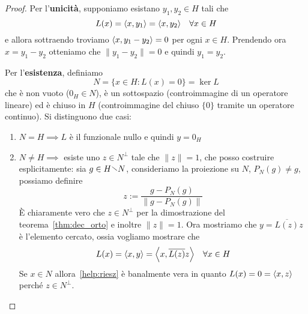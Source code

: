 \begin{proof}
    Per l'\textbf{unicità}, supponiamo esistano \(y_{1}, y_{2} \in H\) tali che
    \[
        L{(x)} = {\left\langle x, y_{1}\right\rangle} = {\left\langle x, y_{2}\right\rangle} \quad \forall x \in H
    \]
    e allora sottraendo troviamo \({\left\langle x, y_{1} - y_{2}\right\rangle} = 0\) per ogni \(x
    \in H\). Prendendo ora \(x = y_{1} - y_{2}\) otteniamo che \(\|y_{1} -
    y_{2}\| = 0\) e quindi \(y_{1} = y_{2}\).

    Per l'\textbf{esistenza}, definiamo 
    \[
      N = \{x \in H : L{(x)} = 0\} = \ker L
    \]
    che è non vuoto (\(0_H \in N\)), è un
    sottospazio (controimmagine di un operatore lineare) ed è chiuso in \(H\)
    (controimmagine del chiuso \(\{0\}\) tramite
    un operatore continuo). Si distinguono due casi:
\begin{enumerate}[label = \arabic*.]
    \item \(N = H \implies L\) è il funzionale nullo e quindi \(y = 0_H\) 
    \item \(N \neq H \implies \) esiste uno \(z \in N^\perp \) tale che
        \(\|z\| = 1\), che posso costruire esplicitamente: sia \(g \in H \sminus N \), consideriamo
        la proiezione su \(N\),
        \(P_N{(g)} \neq g\), possiamo definire 
        \[z := \frac{g - P_N{(g)}}{\|g - P_N{(g)}\|}\]
        È chiaramente vero che \(z \in N^\perp \)
        per la dimostrazione del teorema~\ref{thm:dec_orto} e inoltre \(\|z\| = 1\). Ora mostriamo
        che \(y = \overline{L{(z)}} z\) è l'elemento cercato, ossia vogliamo
        mostrare che
        \begin{equation}\label{help:riesz}
        L{(x)} = {\left\langle x, y\right\rangle} = {\left\langle x, \overline{L{(z)}}z\right\rangle}  \quad \forall x \in H
        \end{equation}
        Se \(x \in N\) allora~\eqref{help:riesz} è banalmente vera in quanto
        \(L{(x)} = 0 = {\left\langle x, z\right\rangle}\) perché \(z \in N^\perp\).


\end{enumerate}
\end{proof}
